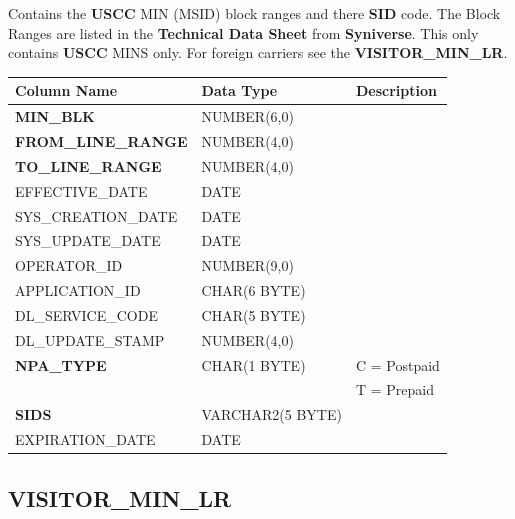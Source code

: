 \documentclass[12pt,twoside]{article}
\begin{document}
   Contains the \textbf{USCC} MIN (MSID) block ranges and there \textbf{SID} code. The Block Ranges are listed in the \textbf{Technical Data Sheet} from \textbf{Syniverse}. This only contains \textbf{USCC} MINS only. For foreign carriers see the \textbf{VISITOR\_MIN\_LR}.
\scriptsize

\begin{center}
\begin{tabular}{lll}
\hline
 \textbf{Column Name}        &  \textbf{Data Type}  &  \textbf{Description}  \\
\hline
 \textbf{MIN\_BLK}           &  NUMBER(6,0)         &                        \\
 \textbf{FROM\_LINE\_RANGE}  &  NUMBER(4,0)         &                        \\
 \textbf{TO\_LINE\_RANGE}    &  NUMBER(4,0)         &                        \\
 EFFECTIVE\_DATE             &  DATE                &                        \\
 SYS\_CREATION\_DATE         &  DATE                &                        \\
 SYS\_UPDATE\_DATE           &  DATE                &                        \\
 OPERATOR\_ID                &  NUMBER(9,0)         &                        \\
 APPLICATION\_ID             &  CHAR(6 BYTE)        &                        \\
 DL\_SERVICE\_CODE           &  CHAR(5 BYTE)        &                        \\
 DL\_UPDATE\_STAMP           &  NUMBER(4,0)         &                        \\
 \textbf{NPA\_TYPE}          &  CHAR(1 BYTE)        &  C = Postpaid          \\
                             &                      &  T = Prepaid           \\
 \textbf{SIDS}               &  VARCHAR2(5 BYTE)    &                        \\
 EXPIRATION\_DATE            &  DATE                &                        \\
\hline
\end{tabular}
\end{center}


\normalsize
\subsection{VISITOR\_MIN\_LR}
\label{sec-9-7}
\end{document}

